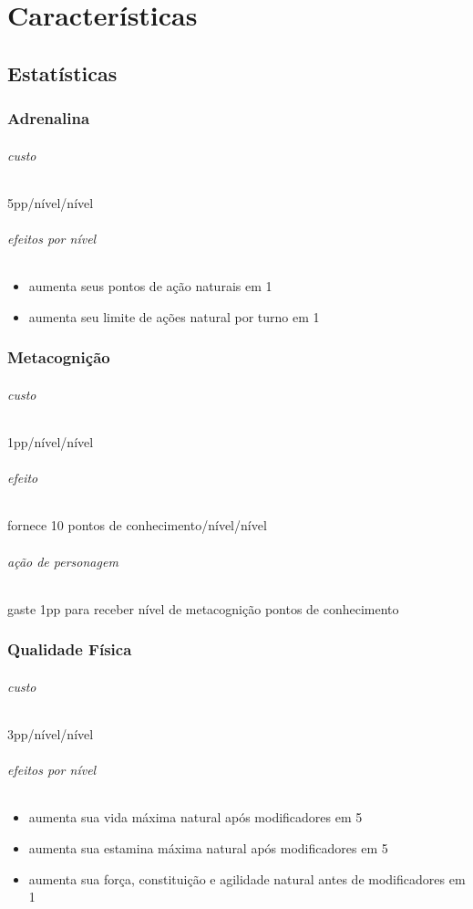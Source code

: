 \part{Características}
\chapter{Estatísticas}
\section{Adrenalina}
\paragraph{custo} 5pp/nível/nível
\paragraph{efeitos por nível} 
\begin{itemize}
  \item aumenta seus pontos de ação naturais em 1 
  \item aumenta seu limite de ações natural por turno em 1 
\end{itemize}
%
\section{Metacognição}
\paragraph{custo} 1pp/nível/nível
\paragraph{efeito} fornece 10 pontos de conhecimento/nível/nível
\paragraph{ação de personagem} gaste 1pp para receber nível de metacognição pontos de conhecimento
%
\section{Qualidade Física}
\paragraph{custo} 3pp/nível/nível
\paragraph{efeitos por nível} 
\begin{itemize}
    \item aumenta sua vida máxima natural após modificadores em 5
    \item aumenta sua estamina máxima natural após modificadores em 5
    \item aumenta sua força, constituição e agilidade natural antes de modificadores em 1
\end{itemize}
%
